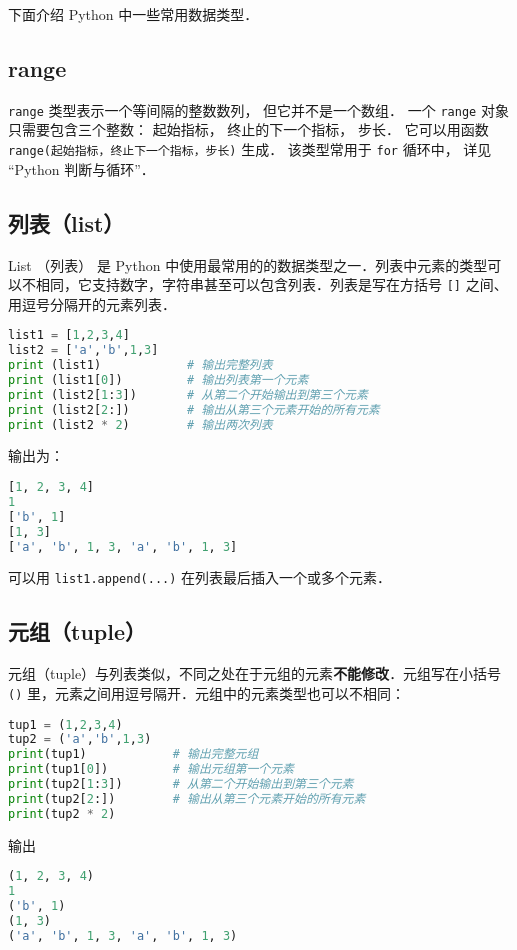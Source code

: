 

下面介绍 Python 中一些常用数据类型． 

\subsection{range}
\verb|range| 类型表示一个等间隔的整数数列， 但它并不是一个数组． 一个 \verb|range| 对象只需要包含三个整数： 起始指标， 终止的下一个指标， 步长． 它可以用函数 \verb|range(起始指标，终止下一个指标，步长)| 生成． 该类型常用于 \verb|for| 循环中， 详见 “Python 判断与循环”．

\subsection{列表（list）}
List （列表） 是 Python 中使用最常用的的数据类型之一．列表中元素的类型可以不相同，它支持数字，字符串甚至可以包含列表．列表是写在方括号 \verb|[]| 之间、用逗号分隔开的元素列表．
\begin{lstlisting}[language=python]
list1 = [1,2,3,4]
list2 = ['a','b',1,3]
print (list1)            # 输出完整列表
print (list1[0])         # 输出列表第一个元素
print (list2[1:3])       # 从第二个开始输出到第三个元素
print (list2[2:])        # 输出从第三个元素开始的所有元素
print (list2 * 2)        # 输出两次列表
\end{lstlisting}
输出为：
\begin{lstlisting}[language=python]
[1, 2, 3, 4]
1
['b', 1]
[1, 3]
['a', 'b', 1, 3, 'a', 'b', 1, 3]
\end{lstlisting}
可以用 \verb|list1.append(...)| 在列表最后插入一个或多个元素．

\subsection{元组（tuple）}
元组（tuple）与列表类似，不同之处在于元组的元素\textbf{不能修改}．元组写在小括号 \verb|()| 里，元素之间用逗号隔开．元组中的元素类型也可以不相同：
\begin{lstlisting}[language=python]
tup1 = (1,2,3,4)
tup2 = ('a','b',1,3)
print(tup1)            # 输出完整元组
print(tup1[0])         # 输出元组第一个元素
print(tup2[1:3])       # 从第二个开始输出到第三个元素
print(tup2[2:])        # 输出从第三个元素开始的所有元素
print(tup2 * 2)
\end{lstlisting}
输出
\begin{lstlisting}[language=python]
(1, 2, 3, 4)
1
('b', 1)
(1, 3)
('a', 'b', 1, 3, 'a', 'b', 1, 3)
\end{lstlisting}

